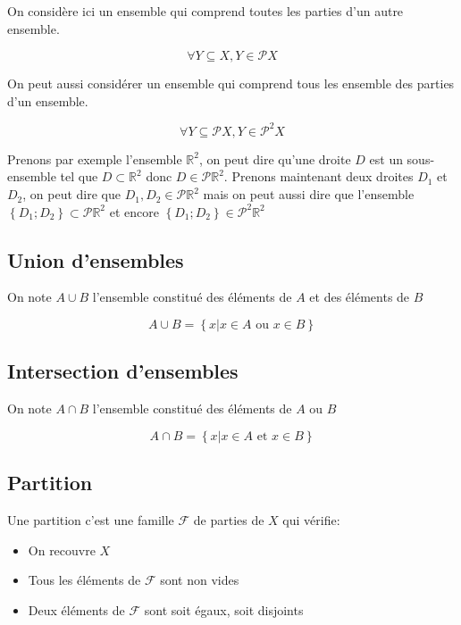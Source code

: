 \documentclass[a4paper,10pt]{article}
\newcommand{\tset}[1]{\left\lbrace #1 \right\rbrace}
\begin{document}
On considère ici un ensemble qui comprend toutes les parties d'un autre ensemble.

$$\forall Y \subseteq X, Y \in \mathcal{P} X$$

On peut aussi considérer un ensemble qui comprend tous les ensemble des parties d'un ensemble.

$$\forall Y \subseteq \mathcal{P} X, Y \in \mathcal{P}^2 X$$

Prenons par exemple l'ensemble $\mathbb{R}^2$, on peut dire qu'une droite $D$ est un sous-ensemble tel que $D \subset \mathbb{R}^2$ donc $D \in \mathcal{P} \mathbb{R}^2$. Prenons maintenant deux droites $D_1$ et $D_2$, on peut dire que $D_1,D_2 \in \mathcal{P} \mathbb{R}^2$ mais on peut aussi dire que l'ensemble $\left\lbrace D_1 ; D_2  \right\rbrace \subset \mathcal{P} \mathbb{R}^2$ et encore $\left\lbrace D_1 ; D_2  \right\rbrace \in \mathcal{P}^2 \mathbb{R}^2$

\newpage


\subsection{Union d'ensembles}

On note $A \cup B$ l'ensemble constitué des éléments de $A$ et des éléments de $B$

$$A \cup B = \tset{x \vert x\in A \mbox{ ou } x \in B}$$

\subsection{Intersection d'ensembles}

On note $A \cap B$ l'ensemble constitué des éléments de $A$ ou $B$

$$A \cap B = \left\{ x \vert x \in A \mbox{ et } x \in B \right\}$$

\subsection{Partition}

Une partition c'est une famille $\mathcal{F}$ de parties de $X$ qui vérifie:

\begin{itemize}
 \item{On recouvre $X$}
 \item{Tous les éléments de $\mathcal{F}$ sont non vides}
 \item{Deux éléments de $\mathcal{F}$ sont soit égaux, soit disjoints}
\end{itemize}
\end{document}
